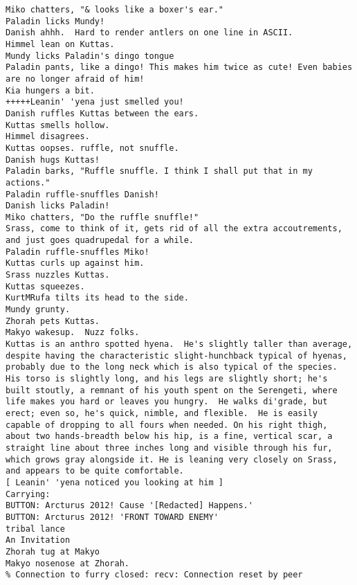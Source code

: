 \begin{verbatim}
Miko chatters, "& looks like a boxer's ear."
Paladin licks Mundy!
Danish ahhh.  Hard to render antlers on one line in ASCII.
Himmel lean on Kuttas.
Mundy licks Paladin's dingo tongue
Paladin pants, like a dingo! This makes him twice as cute! Even babies are no longer afraid of him!
Kia hungers a bit.
+++++Leanin' 'yena just smelled you!
Danish ruffles Kuttas between the ears.
Kuttas smells hollow.
Himmel disagrees.
Kuttas oopses. ruffle, not snuffle.
Danish hugs Kuttas!
Paladin barks, "Ruffle snuffle. I think I shall put that in my actions."
Paladin ruffle-snuffles Danish!
Danish licks Paladin!
Miko chatters, "Do the ruffle snuffle!"
Srass, come to think of it, gets rid of all the extra accoutrements, and just goes quadrupedal for a while.
Paladin ruffle-snuffles Miko!
Kuttas curls up against him.
Srass nuzzles Kuttas.
Kuttas squeezes.
KurtMRufa tilts its head to the side.
Mundy grunty.
Zhorah pets Kuttas.
Makyo wakesup.  Nuzz folks.
Kuttas is an anthro spotted hyena.  He's slightly taller than average, despite having the characteristic slight-hunchback typical of hyenas, probably due to the long neck which is also typical of the species.  His torso is slightly long, and his legs are slightly short; he's built stoutly, a remnant of his youth spent on the Serengeti, where life makes you hard or leaves you hungry.  He walks di'grade, but erect; even so, he's quick, nimble, and flexible.  He is easily capable of dropping to all fours when needed. On his right thigh, about two hands-breadth below his hip, is a fine, vertical scar, a straight line about three inches long and visible through his fur, which grows gray alongside it. He is leaning very closely on Srass, and appears to be quite comfortable.
[ Leanin' 'yena noticed you looking at him ]
Carrying:
BUTTON: Arcturus 2012! Cause '[Redacted] Happens.'
BUTTON: Arcturus 2012! 'FRONT TOWARD ENEMY'
tribal lance
An Invitation
Zhorah tug at Makyo
Makyo nosenose at Zhorah.
% Connection to furry closed: recv: Connection reset by peer
\end{verbatim}
